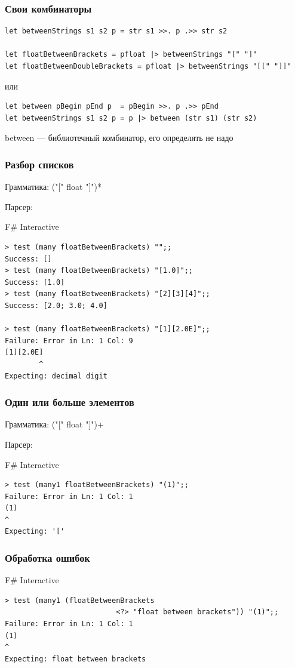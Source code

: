 \documentclass[xetex,mathserif,serif]{beamer}
\begin{document}
	\begin{frame}[fragile]
		\frametitle{Свои комбинаторы}
		\begin{verbatim}
let betweenStrings s1 s2 p = str s1 >>. p .>> str s2

let floatBetweenBrackets = pfloat |> betweenStrings "[" "]"
let floatBetweenDoubleBrackets = pfloat |> betweenStrings "[[" "]]"
		\end{verbatim}

		или

		\begin{verbatim}
let between pBegin pEnd p  = pBegin >>. p .>> pEnd
let betweenStrings s1 s2 p = p |> between (str s1) (str s2)
		\end{verbatim}

		between --- библиотечный комбинатор, его определять не надо
	\end{frame}

	\begin{frame}[fragile]
		\frametitle{Разбор списков}
		Грамматика: ("[" float "]")*

		Парсер:
		\begin{alertblock}{F\# Interactive}
			\begin{verbatim}
> test (many floatBetweenBrackets) "";;
Success: []
> test (many floatBetweenBrackets) "[1.0]";;
Success: [1.0]
> test (many floatBetweenBrackets) "[2][3][4]";;
Success: [2.0; 3.0; 4.0]

> test (many floatBetweenBrackets) "[1][2.0E]";;
Failure: Error in Ln: 1 Col: 9
[1][2.0E]
        ^
Expecting: decimal digit
			\end{verbatim}
		\end{alertblock}
	\end{frame}

	\begin{frame}[fragile]
		\frametitle{Один или больше элементов}
		Грамматика: ("[" float "]")+

		Парсер:
		\begin{alertblock}{F\# Interactive}
			\begin{verbatim}
> test (many1 floatBetweenBrackets) "(1)";;
Failure: Error in Ln: 1 Col: 1
(1)
^
Expecting: '['
			\end{verbatim}
		\end{alertblock}
	\end{frame}

	\begin{frame}[fragile]
		\frametitle{Обработка ошибок}
		\begin{alertblock}{F\# Interactive}
			\begin{verbatim}
> test (many1 (floatBetweenBrackets 
                          <?> "float between brackets")) "(1)";;
Failure: Error in Ln: 1 Col: 1
(1)
^
Expecting: float between brackets
			\end{verbatim}
		\end{alertblock}
	\end{frame}
\end{document}
